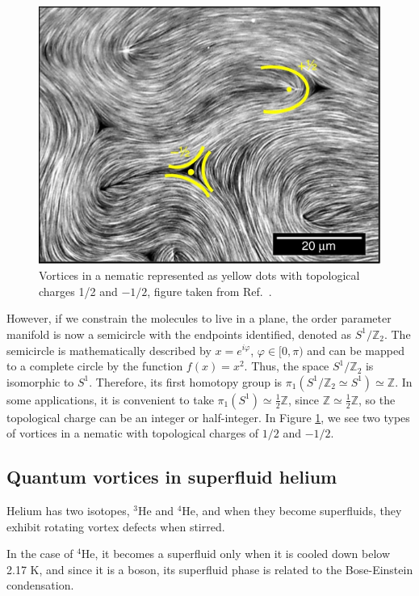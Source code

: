 \begin{figure}
\centering
	\includegraphics[scale=0.5]{./figures/vortexnematics.png}
	\caption{Vortices in a nematic represented as yellow dots with topological charges 1/2 and $-1/2$, figure taken from Ref.\ \cite{Doos2018}.}
	\label{fig:vortexnematic}
\end{figure}

However, if we constrain the molecules to live in a plane, the order parameter manifold is now a semicircle with the endpoints identified, denoted as $S^1/\mathbb{Z}_2$. The semicircle is mathematically described by $x=e^{i\varphi}$, $\varphi\in [0,\pi)$ and can be mapped to a complete circle by the function $f(x) = x^2$. Thus, the space $S^1/\mathbb{Z}_2$ is isomorphic to $S^1$. Therefore, its  first homotopy group is $\pi_1(S^1/\mathbb{Z}_2 \simeq S^1) \simeq \mathbb{Z}$. In some applications, it is convenient to take $\pi_1(S^1) \simeq \frac{1}{2}\mathbb{Z}$, since $\mathbb{Z}\simeq \frac{1}{2}\mathbb{Z}$, so the topological charge can be an integer or half-integer. In Figure \ref{fig:vortexnematic}, we see two types of vortices in a nematic with topological charges of $1/2$ and $-1/2$.

\subsection{Quantum vortices in superfluid helium}\label{sec:helium}
Helium has two isotopes, $^3$He and $^4$He, and when they become superfluids, they exhibit rotating vortex defects when stirred.

In the case of $^4$He, it becomes a superfluid only when it is cooled down below 2.17 K, and since it is a boson, its superfluid phase is related to the Bose-Einstein condensation. 

